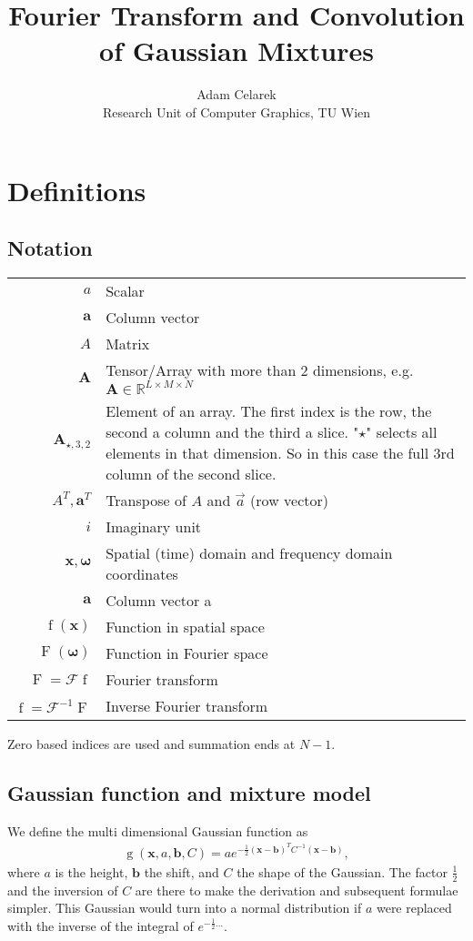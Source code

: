 \documentclass{paper}
\title{Fourier Transform and Convolution of Gaussian Mixtures}
\author{Adam Celarek\\Research Unit of Computer Graphics, TU Wien}
\newcommand{\F}{\ensuremath{\mathcal{F}}}
\newcommand{\vr}[1]{\ensuremath{\boldsymbol{#1}}}
\newcommand{\tr}[1]{\ensuremath{\boldsymbol{#1}}}
\newcommand{\f}[1]{\operatorname{#1}}
\begin{document}
\maketitle

\section{Definitions}
\subsection*{Notation}
\begin{center}
	\begin{supertabular}{rp{8cm}}
		$a$	& Scalar \\
		$\vr{a}$	& Column vector \\
		$A$			& Matrix \\ 
		$\tr{A}$	& Tensor/Array with more than 2 dimensions, e.g. $\tr{A} \in \mathbb{R}^{L \times M \times N}$ \\ 
		$\tr{A}_{\star, 3, 2}$
					& Element of an array.
					The first index is the row, the second a column and the third a slice.
					"$\star$" selects all elements in that dimension.
					So in this case the full 3rd column of the second slice. \\ 
		$A^T, \vr{a}^T$
					& Transpose of $A$ and $\vec{a}$ (row vector) \\
		$i$			& Imaginary unit \\
		$\vr{x}, \vr{\omega}$
					& Spatial (time) domain and frequency domain coordinates \\
		$\vr{a}$	& Column vector a \\
		$\f{f}(\vr{x})$
					& Function in spatial space \\
		$\f{F}(\vr{\omega})$
					& Function in Fourier space \\
		$\f{F} = \F \f{f}$
					& Fourier transform \\
		$\f{f} = \F^{-1} \f{F}$
					& Inverse Fourier transform \\
	\end{supertabular}
\end{center}
Zero based indices are used and summation ends at $N-1$.

\subsection*{Gaussian function and mixture model}
We define the multi dimensional Gaussian function as
\begin{align}
\f{g}(\vr{x}, a, \vr{b}, C) = a e^{-\frac{1}{2}(\vr{x}-\vr{b})^TC^{-1}(\vr{x}-\vr{b})},
\end{align}
where $a$ is the height, $\vr{b}$ the shift, and $C$ the shape of the Gaussian.
The factor $\frac{1}{2}$ and the inversion of $C$ are there to make the derivation and subsequent formulae simpler.
This Gaussian would turn into a normal distribution if $a$ were replaced with the inverse of the integral of $e^{-\frac{1}{2}...}$.
\end{document}
